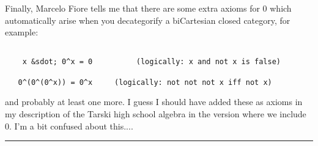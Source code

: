 Finally, Marcelo Fiore tells me that there are some extra axioms for
0 which automatically arise when you decategorify a biCartesian closed
category, for example:

\begin{verbatim}

    x &sdot; 0^x = 0          (logically: x and not x is false)
 
   0^(0^(0^x)) = 0^x     (logically: not not not x iff not x)
\end{verbatim}
    
and probably at least one more.  I guess I should have added these 
as axioms in my description of the Tarski high school algebra 
in the version where we include 0.  I'm a bit confused about this....


 \par\noindent\rule{\textwidth}{0.4pt}

